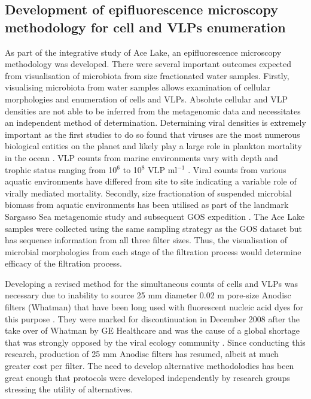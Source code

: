 \subsection[Epifluorescence microscopy methodology]{Development of epifluorescence microscopy methodology for cell and \acp{VLP} enumeration}
As part of the integrative study of Ace Lake, an epifluorescence microscopy methodology was developed.
There were several important outcomes expected from visualisation of microbiota from size fractionated water samples. 
Firstly, visualising microbiota from water samples allows examination of cellular morphologies and enumeration of cells and \acp{VLP}.
Absolute cellular and \ac{VLP} densities are not able to be inferred from the metagenomic data and necessitates an independent method of determination.
Determining viral densities is extremely important as the first studies to do so found that viruses are the most numerous biological entities on the planet and likely play a large role in plankton mortality in the ocean \cite{Bergh1989,Proctor1990}. %
\ac{VLP} counts from marine environments vary with depth and trophic status ranging from 10$^6$ to 10$^8$ \acs{VLP} ml$^{-1}$ \cite{Suttle2005}. %
Viral counts from various aquatic environments have differed from site to site indicating a variable role of virally mediated mortality. %
Secondly, size fractionation of suspended microbial biomass from aquatic environments has been utilised as part of the landmark Sargasso Sea metagenomic study \cite{Venter2004} and subsequent \ac{GOS} expedition \cite{Rusch2007}.
The Ace Lake samples were collected using the same sampling strategy as the \ac{GOS} dataset but has sequence information from all three filter sizes. 
Thus, the visualisation of microbial morphologies from each stage of the filtration process would determine efficacy of the filtration process.

Developing a revised method for the simultaneous counts of cells and \acp{VLP} was necessary due to inability to source 25 mm diameter 0.02 \textmu{}m pore-size Anodisc filters (Whatman) that have been long used with fluorescent nucleic acid dyes for this purpose \cite{Hennes1995, Noble1998, Patel2007}. 
They were marked for discontinuation in December 2008 after the take over of Whatman by \textsc{GE} Healthcare and was the cause of a global shortage that was strongly opposed by the viral ecology community \cite{Torrice2009}.
Since conducting this research, production of 25 mm Anodisc filters has resumed, albeit at much greater cost per filter. 
The need to develop alternative methodolodies has been great enough that protocols were developed independently by research groups \cite{Budinoff2011, Diemer2012} stressing the utility of alternatives.

